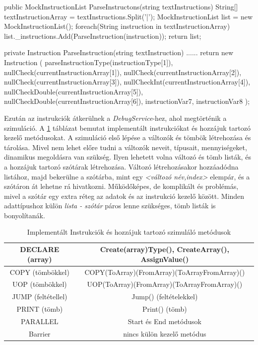\begin{cpp}
public MockInstructionList ParseInstructons(string textInstructions)
{
    String[] textInstructionArray = textInstructions.Split('|');
    MockInstructionList list = new MockInstructionList();
    foreach(String instruction in textInstructionArray)
    {         
        list._instructions.Add(ParseInstruction(instruction));
    }
    return list;
}
        
private Instruction ParseInstruction(string textInstruction)
{
    ......
    return  new Instruction
	(
		parseInstructionType(instructionType[1]),
        nullCheck(currentInstructionArray[1]),
        nullCheck(currentInstructionArray[2]),
        nullCheck(currentInstructionArray[3]), 
        nullCheckInt(currentInstructionArray[4]),
        nullCheckDouble(currentInstructionArray[5]),
        nullCheckDouble(currentInstructionArray[6]),
        instructionVar7,
        instructionVar8
	);
}
\end{cpp}


Ezután az instrukciók átkerülnek a \textit{DebugService}-hez, ahol megtörténik a szimuláció. A \ref{tab:instru} táblázat bemutat implementált instrukciókat és hozzájuk tartozó kezelő metódusokat. A szimuláció első lépése a változók és tömbök létrehozása és tárolása. Mivel nem lehet előre tudni a változók neveit, típusait, mennyiségeket, dinamikus megoldásra van szükség. Ilyen lehetett volna változó és tömb listák, és a hozzájuk tartozó szótárak létrehozása. Változó létrehozásakor hozzáadódna listához, majd bekerülne a szótárba, mint egy \textit{<változó név,index>} elempár, és a szótáron át lehetne rá hivatkozni. Működőképes, de komplikált és problémás, mivel a szótár egy extra réteg az adatok és az instrukció kezelő között. Minden adattípushoz külön \textit{lista - szótár} páros lenne szükséges, tömb listák is bonyolítanák.

\begin{table}[h]
\centering
\caption{Implementált Instrukciók és hozzájuk tartozó szimuláló metódusok}
\label{tab:instru}
\begin{tabular}{|c|c|}
\hline
DECLARE (array) & Create(array)Type(), CreateArray(), AssignValue()  \\
\hline
COPY (tömbökkel) & COPY(ToArray)(FromArray)(ToArrayFromArray)() \\
\hline
UOP (tömbökkel) & UOP(ToArray)(FromArray)(ToArrayFromArray)() \\
\hline
JUMP (feltétellel) & Jump() (feltételekkel)\\
\hline 
PRINT (tömb) & Print() (tömb) \\
\hline
PARALLEL & Start és End metódusok \\
\hline
Barrier & nincs külön kezelő metódus \\
\hline
\end{tabular}
\end{table}

